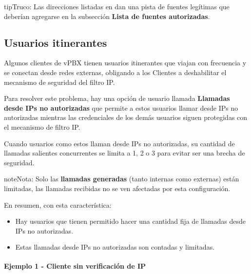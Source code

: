 \documentclass[letterpaper,10pt,spanish]{sphinxmanual}
\begin{document}
\begin{notice}{tip}{Truco:}
Las direcciones listadas en {\hyperref[administration_portal/brand/views/ipfilter_blocked_addresses:ip\string-filter\string-blocked\string-addresses]{}} dan una pista de fuentes legítimas que deberían agregarse en la subsección \textbf{Lista de fuentes autorizadas}.
\end{notice}


\subsection{Usuarios itinerantes}
\label{security_and_maintenance/security/authorized_ip_ranges:id2}\label{security_and_maintenance/security/authorized_ip_ranges:roadwarrior-users}
Algunos clientes de vPBX tienen usuarios itinerantes que viajan con frecuencia y se conectan desde redes externas, obligando a los Clientes a deshabilitar el mecanismo de seguridad del filtro IP.

Para resolver este problema, hay una opción de usuario llamada \textbf{Llamadas desde IPs no autorizadas} que permite a estos usuarios llamar desde IPs no autorizadas mientras las credenciales de los demás usuarios siguen protegidas con el mecanismo de filtro IP.

Cuando usuarios como estos llaman desde IPs no autorizadas, su cantidad de llamadas salientes concurrentes se limita a 1, 2 o 3 para evitar ser una brecha de seguridad.

\begin{notice}{note}{Nota:}
Solo las \textbf{llamadas generadas} (tanto internas como externas) están limitadas, las llamadas recibidas no se ven afectadas por esta configuración.
\end{notice}

En resumen, con esta característica:
\begin{itemize}
\item {} 
Hay usuarios que tienen permitido hacer una cantidad fija de llamadas desde IPs no autorizadas.

\item {} 
Estas llamadas desde IPs no autorizadas son contadas y limitadas.

\end{itemize}
\paragraph{Ejemplo 1 - Cliente sin verificación de IP}
\end{document}
